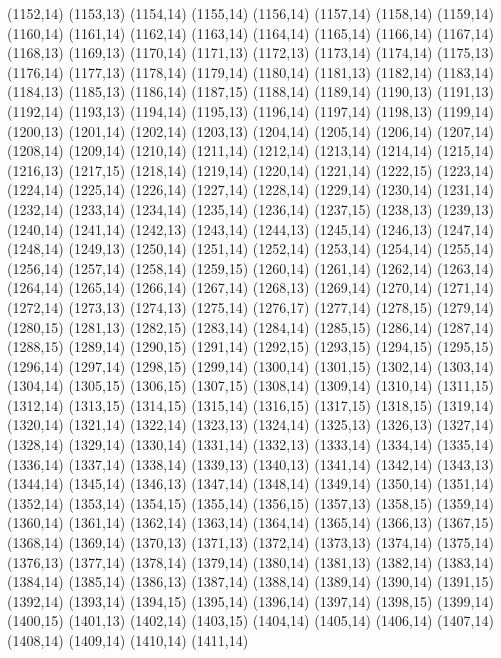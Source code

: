 (1152,14)
(1153,13)
(1154,14)
(1155,14)
(1156,14)
(1157,14)
(1158,14)
(1159,14)
(1160,14)
(1161,14)
(1162,14)
(1163,14)
(1164,14)
(1165,14)
(1166,14)
(1167,14)
(1168,13)
(1169,13)
(1170,14)
(1171,13)
(1172,13)
(1173,14)
(1174,14)
(1175,13)
(1176,14)
(1177,13)
(1178,14)
(1179,14)
(1180,14)
(1181,13)
(1182,14)
(1183,14)
(1184,13)
(1185,13)
(1186,14)
(1187,15)
(1188,14)
(1189,14)
(1190,13)
(1191,13)
(1192,14)
(1193,13)
(1194,14)
(1195,13)
(1196,14)
(1197,14)
(1198,13)
(1199,14)
(1200,13)
(1201,14)
(1202,14)
(1203,13)
(1204,14)
(1205,14)
(1206,14)
(1207,14)
(1208,14)
(1209,14)
(1210,14)
(1211,14)
(1212,14)
(1213,14)
(1214,14)
(1215,14)
(1216,13)
(1217,15)
(1218,14)
(1219,14)
(1220,14)
(1221,14)
(1222,15)
(1223,14)
(1224,14)
(1225,14)
(1226,14)
(1227,14)
(1228,14)
(1229,14)
(1230,14)
(1231,14)
(1232,14)
(1233,14)
(1234,14)
(1235,14)
(1236,14)
(1237,15)
(1238,13)
(1239,13)
(1240,14)
(1241,14)
(1242,13)
(1243,14)
(1244,13)
(1245,14)
(1246,13)
(1247,14)
(1248,14)
(1249,13)
(1250,14)
(1251,14)
(1252,14)
(1253,14)
(1254,14)
(1255,14)
(1256,14)
(1257,14)
(1258,14)
(1259,15)
(1260,14)
(1261,14)
(1262,14)
(1263,14)
(1264,14)
(1265,14)
(1266,14)
(1267,14)
(1268,13)
(1269,14)
(1270,14)
(1271,14)
(1272,14)
(1273,13)
(1274,13)
(1275,14)
(1276,17)
(1277,14)
(1278,15)
(1279,14)
(1280,15)
(1281,13)
(1282,15)
(1283,14)
(1284,14)
(1285,15)
(1286,14)
(1287,14)
(1288,15)
(1289,14)
(1290,15)
(1291,14)
(1292,15)
(1293,15)
(1294,15)
(1295,15)
(1296,14)
(1297,14)
(1298,15)
(1299,14)
(1300,14)
(1301,15)
(1302,14)
(1303,14)
(1304,14)
(1305,15)
(1306,15)
(1307,15)
(1308,14)
(1309,14)
(1310,14)
(1311,15)
(1312,14)
(1313,15)
(1314,15)
(1315,14)
(1316,15)
(1317,15)
(1318,15)
(1319,14)
(1320,14)
(1321,14)
(1322,14)
(1323,13)
(1324,14)
(1325,13)
(1326,13)
(1327,14)
(1328,14)
(1329,14)
(1330,14)
(1331,14)
(1332,13)
(1333,14)
(1334,14)
(1335,14)
(1336,14)
(1337,14)
(1338,14)
(1339,13)
(1340,13)
(1341,14)
(1342,14)
(1343,13)
(1344,14)
(1345,14)
(1346,13)
(1347,14)
(1348,14)
(1349,14)
(1350,14)
(1351,14)
(1352,14)
(1353,14)
(1354,15)
(1355,14)
(1356,15)
(1357,13)
(1358,15)
(1359,14)
(1360,14)
(1361,14)
(1362,14)
(1363,14)
(1364,14)
(1365,14)
(1366,13)
(1367,15)
(1368,14)
(1369,14)
(1370,13)
(1371,13)
(1372,14)
(1373,13)
(1374,14)
(1375,14)
(1376,13)
(1377,14)
(1378,14)
(1379,14)
(1380,14)
(1381,13)
(1382,14)
(1383,14)
(1384,14)
(1385,14)
(1386,13)
(1387,14)
(1388,14)
(1389,14)
(1390,14)
(1391,15)
(1392,14)
(1393,14)
(1394,15)
(1395,14)
(1396,14)
(1397,14)
(1398,15)
(1399,14)
(1400,15)
(1401,13)
(1402,14)
(1403,15)
(1404,14)
(1405,14)
(1406,14)
(1407,14)
(1408,14)
(1409,14)
(1410,14)
(1411,14)
